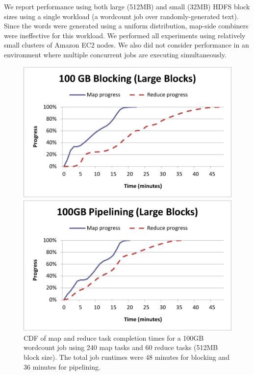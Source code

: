 We report performance using both large (512MB) and small (32MB) HDFS block sizes
using a single workload (a wordcount job over randomly-generated text). Since
the words were generated using a uniform distribution, map-side combiners were
ineffective for this workload. We performed all experiments using relatively
small clusters of Amazon EC2 nodes. We also did not consider performance in an
environment where multiple concurrent jobs are executing simultaneously.

\begin{figure}[t]
\ssp
\begin{minipage}{0.5\linewidth}
  \centering
        \includegraphics[width=0.95\linewidth]{figures/wc_100gb_240m60r_blocking}
\end{minipage}
\begin{minipage}{0.5\linewidth}
  \centering
        \includegraphics[width=0.95\linewidth]{figures/wc_100gb_240m60r_pipeline}
\end{minipage}
\caption{CDF of map and reduce task completion times for a 100GB wordcount job
  using 240 map tasks and 60 reduce tasks (512MB block size). The total job
  runtimes were 48 minutes for blocking and 36 minutes for pipelining.}
\label{fig:wc4}
\end{figure}

